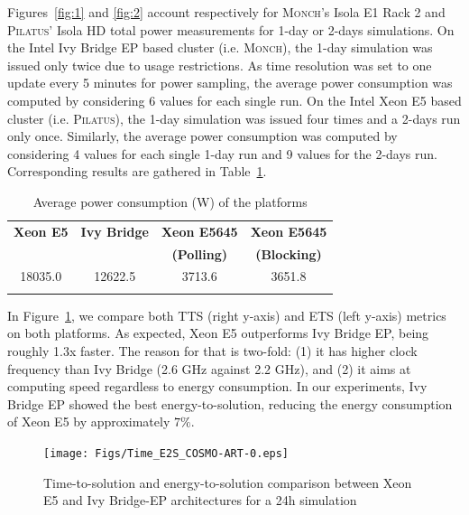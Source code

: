 Figures~\ref{fig:1}   and   \ref{fig:2}   account   respectively   for
\textsc{Monch}'s Isola E1 Rack  2 and \textsc{Pilatus}' Isola HD total
power measurements for  1-day or 2-days simulations. On  the Intel Ivy
Bridge EP  based cluster (i.e.  \textsc{Monch}),  the 1-day simulation
was issued  only twice due  to usage restrictions. As  time resolution
was set to one update every  5 minutes for power sampling, the average
power consumption was computed by considering 6 values for each single
run.  On the Intel Xeon E5 based cluster (i.e.  \textsc{Pilatus}), the
1-day simulation  was issued  four times and  a 2-days run  only once.
Similarly, the average power consumption was computed by considering 4
values  for  each  single  1-day  run  and 9  values  for  the  2-days
run. Corresponding results are gathered in Table~\ref{tab:3}.

\begin{table}[htbf]
  \begin{center}
    \caption{Average power consumption (W) of the platforms}
    \label{tab:3}
    \begin{tabular}{cccc}
      \hline\noalign{\smallskip}
      \textbf{\scriptsize{Xeon E5}} & \textbf{\scriptsize{Ivy Bridge}} & \textbf{\scriptsize{Xeon  E5645}} & \textbf{\scriptsize{Xeon  E5645}}\\
      & & \textbf{\scriptsize{(Polling)}} & \textbf{\scriptsize{(Blocking)}} \\
      \noalign{\smallskip}\hline\noalign{\smallskip}
      18035.0 & 12622.5 & 3713.6 & 3651.8 \\ 
      \noalign{\smallskip}\hline
    \end{tabular}
  \end{center}
\end{table}

In  Figure~\ref{fig:3}, we  compare both  TTS (right  y-axis)  and ETS
(left  y-axis)  metrics  on  both  platforms.  As  expected,  Xeon  E5
outperforms Ivy Bridge EP, being  roughly 1.3x faster.  The reason for
that is  two-fold: (1) it has  higher clock frequency  than Ivy Bridge
(2.6  GHz  against  2.2 GHz),  and  (2)  it  aims at  computing  speed
regardless to  energy consumption.  In our experiments,  Ivy Bridge EP
showed the best energy-to-solution, reducing the energy consumption of
Xeon E5 by approximately $7\%$.

\begin{figure}[htbf]
  \texttt{[image: Figs/Time\_E2S\_COSMO-ART-0.eps]}
  \caption{Time-to-solution and energy-to-solution comparison between
    Xeon E5 and Ivy Bridge-EP architectures for a 24h simulation}
  \label{fig:3}
\end{figure}

